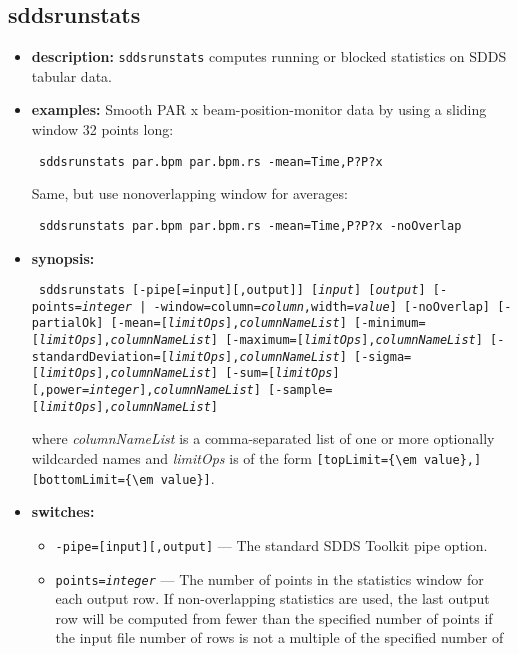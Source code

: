 \begin{latexonly}
\newpage
\end{latexonly}
\subsection{sddsrunstats}
\label{sddsrunstats}

\begin{itemize}
\item {\bf description:}
{\tt sddsrunstats} computes running or blocked statistics on SDDS
tabular data.
\item {\bf examples:}
Smooth PAR x beam-position-monitor data by using a sliding window 32
points long:
\begin{flushleft}{\tt
sddsrunstats par.bpm par.bpm.rs -mean=Time,P?P?x 
}\end{flushleft}
Same, but use nonoverlapping window for averages:
\begin{flushleft}{\tt
sddsrunstats par.bpm par.bpm.rs -mean=Time,P?P?x  -noOverlap
}\end{flushleft}
\item {\bf synopsis:}
\begin{flushleft}{\tt
sddsrunstats [-pipe[=input][,output]] [{\em input}] [{\em output}]
[{-points={\em integer} | -window=column={\em column},width={\em value}}] [-noOverlap]
[-partialOk] 
[-mean=[{\em limitOps}],{\em columnNameList}]
[-minimum=[{\em limitOps}],{\em columnNameList}]
[-maximum=[{\em limitOps}],{\em columnNameList}]
[-standardDeviation=[{\em limitOps}],{\em columnNameList}]
[-sigma=[{\em limitOps}],{\em columnNameList}]
[-sum=[{\em limitOps}][,power={\em integer}],{\em columnNameList}] 
[-sample=[{\em limitOps}],{\em columnNameList}]
}\end{flushleft}
where {\em columnNameList} is a comma-separated list of one or more optionally wildcarded names and
{\em limitOps} is of the form \verb|[topLimit={\em value},][bottomLimit={\em value}]|.
\item {\bf switches:}
    \begin{itemize}
    \item {\tt -pipe=[input][,output]} --- The standard SDDS Toolkit pipe option.
    \item {\tt points={\em integer}} --- The number of points in the statistics window for each
        output row.  If non-overlapping statistics are used, the last output row
        will be computed from fewer than the specified number of points if the
        input file number of rows is not a multiple of the specified number of 

\end{itemize}
\end{itemize}
